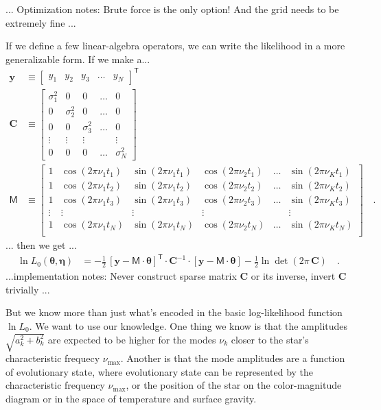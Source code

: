 \documentclass[modern]{aastex63}
\newcommand{\numax}{\nu_\mathrm{max}}
\newcommand{\T}{^{\!\mathsf{T}\!}}
\newcommand{\inv}{^{-1}}
\renewcommand{\vector}[1]{\boldsymbol{#1}}
\newcommand{\vy}{\vector{y}}
\newcommand{\veta}{\vector{\eta}}
\newcommand{\vtheta}{\vector{\theta}}
\renewcommand{\tensor}[1]{\mathbf{#1}}
\newcommand{\tC}{\tensor{C}}
\newcommand{\mat}[1]{\mathsf{#1}}
\newcommand{\mM}{\mat{M}}
\begin{document}
... Optimization notes: Brute force is the only option! And the grid needs
to be extremely fine ...

If we define a few linear-algebra operators, we can write the likelihood in a more
generalizable form.
If we make a...
\begin{align}
  \vy &\equiv \begin{bmatrix} y_1 & y_2 & y_3 & \hdots & y_N \end{bmatrix}\T
  \\
  \tC &\equiv \begin{bmatrix} \sigma_1^2 & 0 & 0 & \hdots & 0 \\
                              0 & \sigma_2^2 & 0 & \hdots & 0 \\
                              0 & 0 & \sigma_3^2 & \hdots & 0 \\
                              \vdots & \vdots & \vdots & & \vdots \\
                              0 & 0 & 0 & \hdots & \sigma_N^2 \end{bmatrix}
  \\
  \mM &\equiv \begin{bmatrix}
    1 & \cos(2\pi\nu_1 t_1) & \sin(2\pi\nu_1 t_1) & \cos(2\pi\nu_2 t_1) & \hdots & \sin(2\pi\nu_K t_1) \\
    1 & \cos(2\pi\nu_1 t_2) & \sin(2\pi\nu_1 t_2) & \cos(2\pi\nu_2 t_2) & \hdots & \sin(2\pi\nu_K t_2) \\
    1 & \cos(2\pi\nu_1 t_3) & \sin(2\pi\nu_1 t_3) & \cos(2\pi\nu_2 t_3) & \hdots & \sin(2\pi\nu_K t_3) \\
    \vdots & \vdots         & \vdots              & \vdots              &        & \vdots \\
    1 & \cos(2\pi\nu_1 t_N) & \sin(2\pi\nu_1 t_N) & \cos(2\pi\nu_2 t_N) & \hdots & \sin(2\pi\nu_K t_N) \\
  \end{bmatrix}
  \quad .
\end{align}
... then we get ...
\begin{align}
  \ln L_0(\vtheta,\veta) &= -\frac{1}{2}\,[\vy - \mM\cdot\vtheta]\T\cdot\tC\inv\cdot[\vy - \mM\cdot\vtheta] - \frac{1}{2}\ln\det(2\pi\,\tC)
  \quad .
\end{align}
...implementation notes: Never construct sparse matrix $\tC$ or its inverse, invert $\tC$ trivially ...

But we know more than just what's encoded in the basic log-likelihood function $\ln L_0$.
We want to use our knowledge.
One thing we know is that the amplitudes $\sqrt{a_k^2+b_k^2}$
are expected to be higher for the
modes $\nu_k$ closer to the star's characteristic frequecy $\numax$.
Another is that the mode amplitudes are a function of evolutionary
state, where evolutionary state can be represented by the characteristic
frequency $\numax$, or the position of
the star on the color-magnitude diagram or in the space of temperature
and surface gravity.
\end{document}
